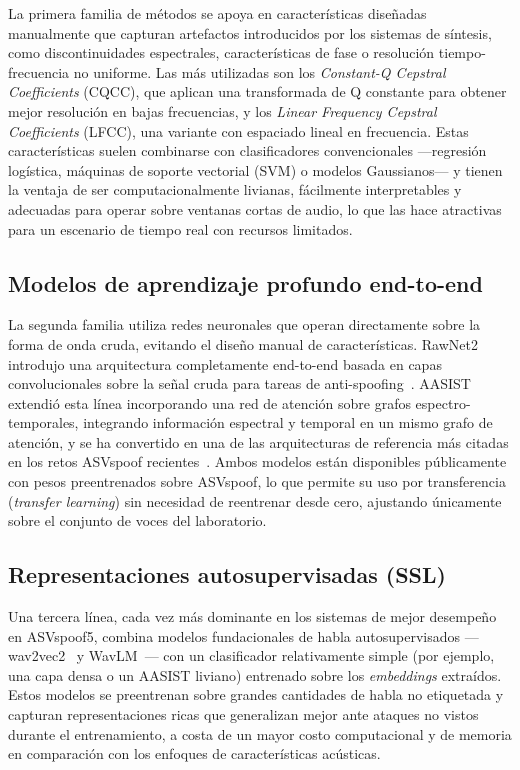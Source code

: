 \documentclass[conference]{IEEEtran}
\begin{document}
La primera familia de métodos se apoya en características diseñadas manualmente que capturan artefactos introducidos por los sistemas de síntesis, como discontinuidades espectrales, características de fase o resolución tiempo-frecuencia no uniforme. Las más utilizadas son los \emph{Constant-Q Cepstral Coefficients} (CQCC), que aplican una transformada de Q constante para obtener mejor resolución en bajas frecuencias, y los \emph{Linear Frequency Cepstral Coefficients} (LFCC), una variante con espaciado lineal en frecuencia. Estas características suelen combinarse con clasificadores convencionales —regresión logística, máquinas de soporte vectorial (SVM) o modelos Gaussianos— y tienen la ventaja de ser computacionalmente livianas, fácilmente interpretables y adecuadas para operar sobre ventanas cortas de audio, lo que las hace atractivas para un escenario de tiempo real con recursos limitados.

\subsection{Modelos de aprendizaje profundo end-to-end}

La segunda familia utiliza redes neuronales que operan directamente sobre la forma de onda cruda, evitando el diseño manual de características. RawNet2 introdujo una arquitectura completamente end-to-end basada en capas convolucionales sobre la señal cruda para tareas de anti-spoofing~\cite{rawnet2}. AASIST extendió esta línea incorporando una red de atención sobre grafos espectro-temporales, integrando información espectral y temporal en un mismo grafo de atención, y se ha convertido en una de las arquitecturas de referencia más citadas en los retos ASVspoof recientes~\cite{aasist}. Ambos modelos están disponibles públicamente con pesos preentrenados sobre ASVspoof, lo que permite su uso por transferencia (\emph{transfer learning}) sin necesidad de reentrenar desde cero, ajustando únicamente sobre el conjunto de voces del laboratorio.

\subsection{Representaciones autosupervisadas (SSL)}

Una tercera línea, cada vez más dominante en los sistemas de mejor desempeño en ASVspoof5, combina modelos fundacionales de habla autosupervisados —wav2vec2~\cite{wav2vec2} y WavLM~\cite{wavlm}— con un clasificador relativamente simple (por ejemplo, una capa densa o un AASIST liviano) entrenado sobre los \emph{embeddings} extraídos. Estos modelos se preentrenan sobre grandes cantidades de habla no etiquetada y capturan representaciones ricas que generalizan mejor ante ataques no vistos durante el entrenamiento, a costa de un mayor costo computacional y de memoria en comparación con los enfoques de características acústicas.
\end{document}
